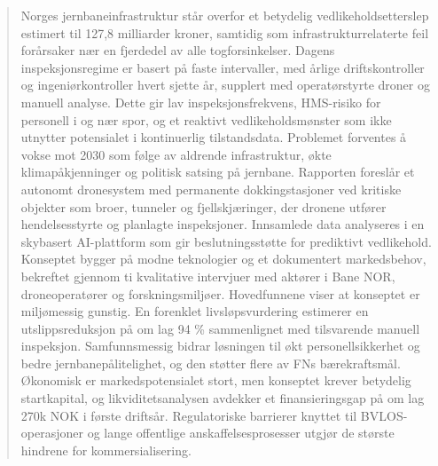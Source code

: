     \begin{abstract} %
%
Norges jernbaneinfrastruktur står overfor et betydelig vedlikeholdsetterslep estimert til 127,8 milliarder kroner, samtidig som infrastrukturrelaterte feil forårsaker nær en fjerdedel av alle togforsinkelser. Dagens inspeksjonsregime er basert på faste intervaller, med årlige driftskontroller og ingeniørkontroller hvert sjette år, supplert med operatørstyrte droner og manuell analyse. Dette gir lav inspeksjonsfrekvens, HMS-risiko for personell i og nær spor, og et reaktivt vedlikeholdsmønster som ikke utnytter potensialet i kontinuerlig tilstandsdata. Problemet forventes å vokse mot 2030 som følge av aldrende infrastruktur, økte klimapåkjenninger og politisk satsing på jernbane.
Rapporten foreslår et autonomt dronesystem med permanente dokkingstasjoner ved kritiske objekter som broer, tunneler og fjellskjæringer, der dronene utfører hendelsesstyrte og planlagte inspeksjoner. Innsamlede data analyseres i en skybasert AI-plattform som gir beslutningsstøtte for prediktivt vedlikehold. Konseptet bygger på modne teknologier og et dokumentert markedsbehov, bekreftet gjennom ti kvalitative intervjuer med aktører i Bane NOR, droneoperatører og forskningsmiljøer.
Hovedfunnene viser at konseptet er miljømessig gunstig. En forenklet livsløpsvurdering estimerer en utslippsreduksjon på om lag 94 \% sammenlignet med tilsvarende manuell inspeksjon. Samfunnsmessig bidrar løsningen til økt personellsikkerhet og bedre jernbanepålitelighet, og den støtter flere av FNs bærekraftsmål. Økonomisk er markedspotensialet stort, men konseptet krever betydelig startkapital, og likviditetsanalysen avdekker et finansieringsgap på om lag 270k NOK i første driftsår. Regulatoriske barrierer knyttet til BVLOS-operasjoner og lange offentlige anskaffelsesprosesser utgjør de største hindrene for kommersialisering.
    
    \end{abstract}
    
    
    